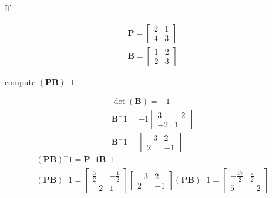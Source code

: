 If 

\begin{align*}
    \boldsymbol{P} = \begin{bmatrix}
        2 & 1 \\ 4 & 3
    \end{bmatrix} \\
    \boldsymbol{B} = \begin{bmatrix}
        1 & 2 \\ 2 & 3
    \end{bmatrix}
\end{align*}

compute $\left(\boldsymbol{PB}\right)^-1$.

\begin{solution}
    \begin{align*}
        \det\left(\boldsymbol{B}\right) = -1 \\
        \boldsymbol{B}^-1 = -1 \begin{bmatrix}
            3 & -2 \\
            -2 &  1
        \end{bmatrix} \\
        \boldsymbol{B}^-1 = \begin{bmatrix}
            -3 & 2 \\
            2 & -1
        \end{bmatrix}
    \end{align*}
    \begin{align*}
        (\boldsymbol{PB})^-1 = \boldsymbol{P}^-1\boldsymbol{B}^-1 \\
        (\boldsymbol{PB})^-1 = \begin{bmatrix}
            \frac{3}{2} & -\frac{1}{2} \\
            -2 & 1
        \end{bmatrix}
        \begin{bmatrix}
            -3 & 2 \\
            2 & -1
        \end{bmatrix}
        (\boldsymbol{PB})^-1 = \begin{bmatrix}
            -\frac{17}{2} & \frac{7}{2} \\
            5 & -2
        \end{bmatrix}
    \end{align*}
\end{solution}